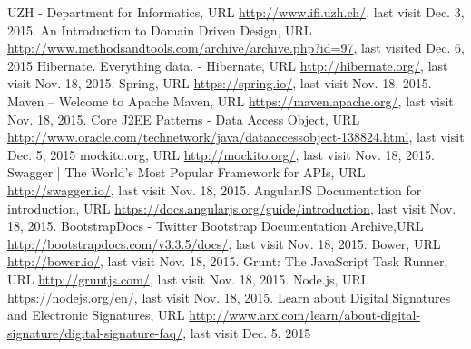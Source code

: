 \begin{thebibliography}{99}

 UZH - Department for Informatics, URL \url{http://www.ifi.uzh.ch/}, last visit Dec. 3, 2015.
 An Introduction to Domain Driven Design, URL \url{http://www.methodsandtools.com/archive/archive.php?id=97}, last visited Dec. 6, 2015
 Hibernate. Everything data. - Hibernate, URL \url{http://hibernate.org/}, last visit Nov. 18, 2015.
 Spring, URL \url{https://spring.io/}, last visit Nov. 18, 2015.
 Maven – Welcome to Apache Maven, URL \url{https://maven.apache.org/}, last visit Nov. 18, 2015.
 Core J2EE Patterns - Data Access Object, URL \url{http://www.oracle.com/technetwork/java/dataaccessobject-138824.html}, last visit Dec. 5, 2015
 mockito.org, URL \url{http://mockito.org/}, last visit Nov. 18, 2015.
 Swagger | The World's Most Popular Framework for APIs, URL \url{http://swagger.io/}, last visit Nov. 18, 2015.
 AngularJS Documentation for introduction, URL \url{https://docs.angularjs.org/guide/introduction}, last visit Nov. 18, 2015.
 BootstrapDocs - Twitter Bootstrap Documentation Archive,\newline URL \url{http://bootstrapdocs.com/v3.3.5/docs/}, last visit Nov. 18, 2015.
 Bower, URL \url{http://bower.io/}, last visit Nov. 18, 2015.
 Grunt: The JavaScript Task Runner, URL \url{http://gruntjs.com/}, last visit Nov. 18, 2015.
 Node.js, URL \url{https://nodejs.org/en/}, last visit Nov. 18, 2015.
 Learn about Digital Signatures and Electronic Signatures, URL \url{http://www.arx.com/learn/about-digital-signature/digital-signature-faq/}, last visit Dec. 5, 2015 




\end{thebibliography}

